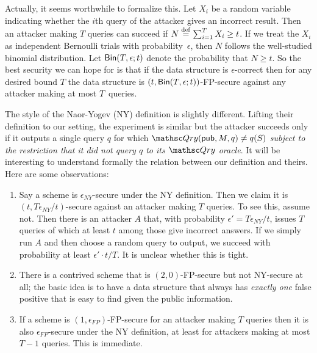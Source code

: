 \def\bin{{\sf Bin}}

Actually, it seems worthwhile to formalize this. Let $X_i$ be a random variable indicating
whether the $i$th query of the attacker gives an incorrect result. Then an attacker making $T$
queries can succeed
if $N \stackrel{{\rm def}}{=} \sum_{i=1}^T X_i \geq t$. If we treat the $X_i$ as independent Bernoulli trials with
probability~$\epsilon$, then $N$ follows the well-studied binomial distribution.
Let $\bin(T, \epsilon; t)$ denote the probability that $N \geq t$. So the best security we can
hope for
is that if the data structure is $\epsilon$-correct then for any desired bound $T$
the data structure is $(t, \bin(T,\epsilon; t))$-FP-secure against any attacker making
at most $T$~queries. 


The style of the Naor-Yogev (NY) definition is slightly different. 
Lifting their definition to our setting, the experiment is similar but the attacker
succeeds only if it outputs a single query $q$ for which $\Qry(\pub, M, q) \neq q(S)$ \emph{subject
to the restriction that it did not query $q$ to its $\Qry$ oracle}.
It will be interesting to understand formally the relation between our definition and theirs.
Here are some observations:
\begin{enumerate}
\item Say a scheme is $\epsilon_{NY}$-secure under the NY definition.
Then we claim it is $(t, T\epsilon_{NY}/t)$-secure against an attacker making $T$ queries. To see
this, assume not. Then there is an attacker $A$ that, with probability $\epsilon'=T\epsilon_{NY}/t$,
issues $T$ queries of which at least $t$ among those give incorrect answers.
If we simply run $A$ and
then choose a random query to output, we succeed with probability at least $\epsilon' \cdot t/T$.
It is unclear whether this is tight.

\item There is a contrived scheme that is $(2, 0)$-FP-secure but not NY-secure at all; the basic idea is
to have a data structure that always has \emph{exactly one} false positive that is easy to find
given the public information.

\item If a scheme is $(1,\epsilon_{FP})$-FP-secure for an attacker making $T$ queries
then it is also $\epsilon_{FP}$-secure under the NY definition,
at least for attackers making at most $T-1$
queries.
This is immediate.
\end{enumerate}

